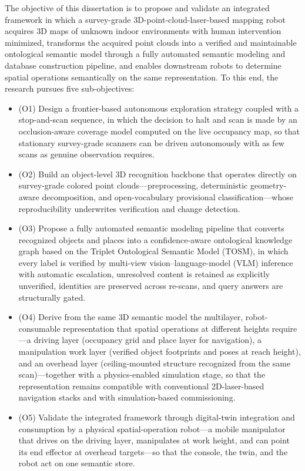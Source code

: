 The objective of this dissertation is to propose and validate an integrated
framework in which a survey-grade 3D-point-cloud-laser-based mapping robot
acquires 3D maps of unknown indoor environments with human intervention
minimized, transforms the acquired point clouds into a verified and maintainable
ontological semantic model through a fully automated semantic modeling and
database construction pipeline, and enables downstream robots to determine
spatial operations semantically on the same representation. To this end, the
research pursues five sub-objectives:

\begin{itemize}[leftmargin=2.2em,itemsep=2pt]
  \item (O1) Design a frontier-based autonomous exploration strategy coupled
        with a stop-and-scan sequence, in which the decision to halt and scan
        is made by an occlusion-aware coverage model computed on the live
        occupancy map, so that stationary survey-grade scanners can be driven
        autonomously with as few scans as genuine observation requires.
  \item (O2) Build an object-level 3D recognition backbone that operates
        directly on survey-grade colored point clouds---preprocessing,
        deterministic geometry-aware decomposition, and open-vocabulary
        provisional classification---whose reproducibility underwrites
        verification and change detection.
  \item (O3) Propose a fully automated semantic modeling pipeline that converts
        recognized objects and places into a confidence-aware ontological
        knowledge graph based on the Triplet Ontological Semantic Model (TOSM),
        in which every label is verified by multi-view vision--language-model
        (VLM) inference with automatic escalation, unresolved content is
        retained as explicitly unverified, identities are preserved across
        re-scans, and query answers are structurally gated.
  \item (O4) Derive from the same 3D semantic model the multilayer,
        robot-consumable representation that spatial operations at different
        heights require---a driving layer (occupancy grid and place layer for
        navigation), a manipulation work layer (verified object footprints and
        poses at reach height), and an overhead layer (ceiling-mounted
        structure recognized from the same scan)---together with a
        physics-enabled simulation stage, so that the representation remains
        compatible with conventional 2D-laser-based navigation stacks and
        with simulation-based commissioning.
  \item (O5) Validate the integrated framework through digital-twin integration
        and consumption by a physical spatial-operation robot---a mobile
        manipulator that drives on the driving layer, manipulates at work
        height, and can point its end effector at overhead targets---so that
        the console, the twin, and the robot act on one semantic store.
\end{itemize}

